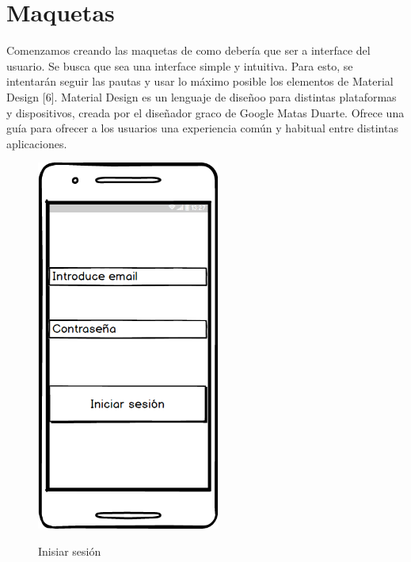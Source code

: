 \newpage
\section{Maquetas}
Comenzamos creando las maquetas de como debería que ser a interface del usuario.
Se busca que sea una interface simple y intuitiva.
Para esto, se intentarán seguir las pautas y usar lo  máximo posible los elementos de Material
Design [6].
Material Design es un lenguaje de diseñoo para distintas plataformas y dispositivos,
creada por el diseñador graco de Google Matas Duarte. Ofrece una guía  para ofrecer
a los usuarios una experiencia común y habitual entre distintas aplicaciones.


	
	
	
	\begin{figure}[htbp]
\begin{minipage}[b]{0.5\linewidth} %
\centering
\includegraphics[width=6cm]{maqueta/Iniciar.png}
 \label{figura1}
\caption{Inisiar sesión}


\end{minipage}
\end{figure}
